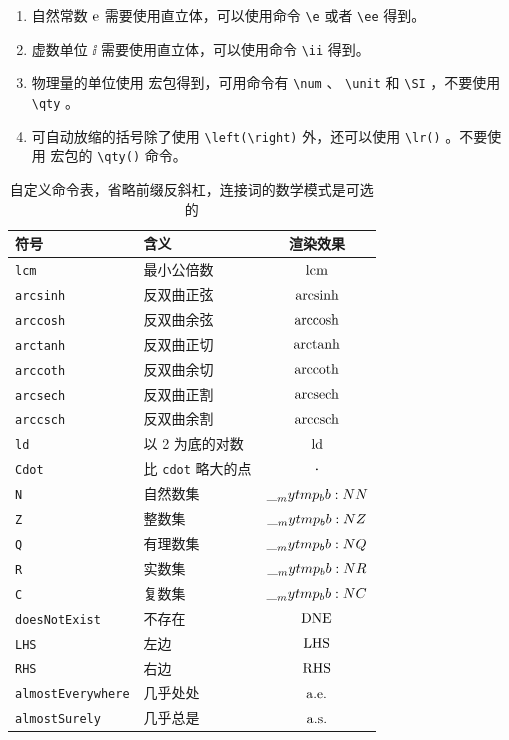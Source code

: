 \documentclass{MMCStyle}
\begin{document}
\begin{enumerate}
    \item 自然常数 $\mathrm{e}$ 需要使用直立体，可以使用命令 \verb|\e| 或者 \verb|\ee| 得到。
    \item 虚数单位 $\ii$ 需要使用直立体，可以使用命令 \verb|\ii| 得到。
    \item 物理量的单位使用  宏包得到，可用命令有 \verb|\num| 、 \verb|\unit| 和 \verb|\SI| ，不要使用 \verb|\qty| 。
    \item 可自动放缩的括号除了使用 \verb|\left(\right)| 外，还可以使用 \verb|\lr()| 。不要使用  宏包的 \verb|\qty()| 命令。
\end{enumerate}
\begin{table}[!htbp]
\centering
\caption{自定义命令表，省略前缀反斜杠，连接词的数学模式是可选的}
\begin{tabularx}{0.8\textwidth}{lYc}
\toprule
\textbf{符号} & \textbf{含义} & \textbf{渲染效果} \\
\midrule
\lstinline|lcm| & 最小公倍数 & $\operatorname{lcm}$ \\
\lstinline|arcsinh| & 反双曲正弦 & $\operatorname{arcsinh}$ \\
\lstinline|arccosh| & 反双曲余弦 & $\operatorname{arccosh}$ \\
\lstinline|arctanh| & 反双曲正切 & $\operatorname{arctanh}$ \\
\lstinline|arccoth| & 反双曲余切 & $\operatorname{arccoth}$ \\
\lstinline|arcsech| & 反双曲正割 & $\operatorname{arcsech}$ \\
\lstinline|arccsch| & 反双曲余割 & $\operatorname{arccsch}$ \\
\lstinline|ld| & 以 2 为底的对数 & $\operatorname{ld}$ \\
\lstinline|Cdot| & 比 \lstinline|cdot| 略大的点 & $\Cdot$ \\
\lstinline|N| & 自然数集 & $\__mytmp_bb:N N$ \\
\lstinline|Z| & 整数集 & $\__mytmp_bb:N Z$ \\
\lstinline|Q| & 有理数集 & $\__mytmp_bb:N Q$ \\
\lstinline|R| & 实数集 & $\__mytmp_bb:N R$ \\
\lstinline|C| & 复数集 & $\__mytmp_bb:N C$ \\
\lstinline|doesNotExist| & 不存在 & $\mathrm{DNE}$ \\
\lstinline|LHS| & 左边 & $\mathrm{LHS}$ \\
\lstinline|RHS| & 右边 & $\mathrm{RHS}$ \\
\lstinline|almostEverywhere| & 几乎处处 & $\mathrm{a.e.}$ \\
\lstinline|almostSurely| & 几乎总是 & $\mathrm{a.s.}$ \\

\end{tabularx}
\end{table}
\end{document}
